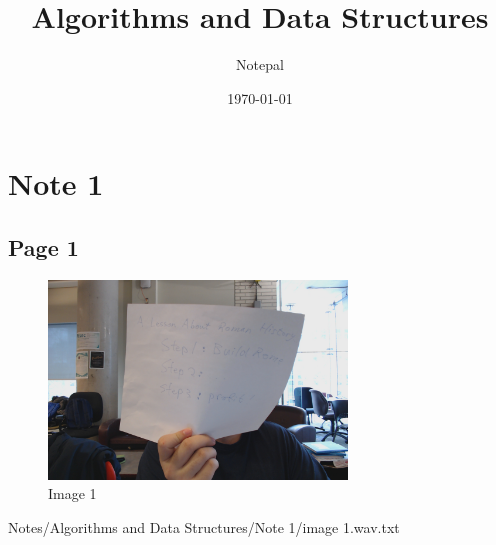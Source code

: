 \documentclass{article}%
\title{Algorithms and Data Structures}%
\author{Notepal}%
\date{\today}%
\begin{document}
%
\normalsize%
\maketitle%
\section{Note 1}%
\label{sec:Note 1}%
\subsection{Page 1}%
\label{subsec:Page 1}%


\begin{figure}[h!]%
\centering%
\includegraphics[width=300px]{Notes/Algorithms and Data Structures/Note 1/image 1.jpg}%
\caption{Image 1}%
\end{figure}

%
Notes/Algorithms and Data Structures/Note 1/image 1.wav.txt

%
\end{document}
